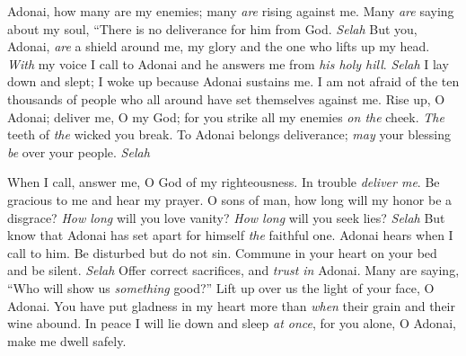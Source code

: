 \begin{biblechapter} %
 Adonai, how many are my enemies; 
many \textit{are} rising against me.
\verse Many \textit{are} saying about my soul, 
“There is no deliverance for him from God. \textit{Selah}
\verse But you, Adonai, \textit{are} a shield around me, 
my glory and the one who lifts up my head.
\verse \textit{With} my voice I call to Adonai 
and he answers me from \textit{his holy hill}. \textit{Selah}
\verse I lay down and slept; 
I woke up because Adonai sustains me.
\verse I am not afraid of the ten thousands of people 
who all around have set themselves against me.
\verse Rise up, O Adonai; deliver me, O my God; 
for you strike all my enemies \textit{on the} cheek. 
\textit{The} teeth of \textit{the} wicked you break.
\verse To Adonai belongs deliverance; 
\textit{may} your blessing \textit{be} over your people. \textit{Selah}
\end{biblechapter}

\begin{biblechapter} %
 When I call, answer me, O God of my righteousness. 
In trouble \textit{deliver me}. 
Be gracious to me and hear my prayer.
\verse O sons of man, how long will my honor be a disgrace? 
\textit{How long} will you love vanity? 
\textit{How long} will you seek lies? \textit{Selah}
\verse But know that Adonai has set apart for himself \textit{the} faithful one. 
Adonai hears when I call to him.
\verse Be disturbed but do not sin. 
Commune in your heart on your bed and be silent. \textit{Selah}
\verse Offer correct sacrifices, 
and \textit{trust in} Adonai.
\verse Many are saying, “Who will show us \textit{something} good?” 
Lift up over us the light of your face, O Adonai.
\verse You have put gladness in my heart 
more than \textit{when} their grain and their wine abound.
\verse In peace I will lie down and sleep \textit{at once}, 
for you alone, O Adonai, make me dwell safely.
\end{biblechapter}

